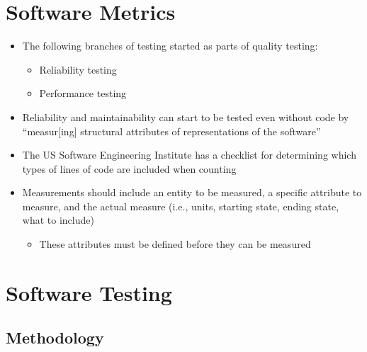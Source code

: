 \section{Software Metrics}
\label{chap:notes:sec:software-metrics}

\begin{itemize}
      \item The following branches of testing started as parts of quality
            testing:
            \begin{itemize}
                  \item Reliability testing \citep[p.~18, ch.~10]{fenton_software_1997}
                  \item Performance testing \citep[p.~18, ch.~7]{fenton_software_1997}
            \end{itemize}
      \item Reliability and maintainability can start to be tested even without
            code by ``measur[ing] structural attributes of representations of the
            software'' \citep[p.~18]{fenton_software_1997}
      \item The US Software Engineering Institute has a checklist for determining
            which types of lines of code are included when counting
            \citep[pp.~30-31]{fenton_software_1997}
      \item Measurements should include an entity to be measured, a specific
            attribute to measure, and the actual measure (i.e., units, starting
            state, ending state, what to include) \citep[p.~36]{fenton_software_1997}
            \begin{itemize}
                  \item These attributes must be defined before they can be
                        measured \citep[p.~38]{fenton_software_1997}
            \end{itemize}
\end{itemize}

\section{Software Testing}
\label{chap:notes:sec:software-testing}

\subsection{Methodology}

